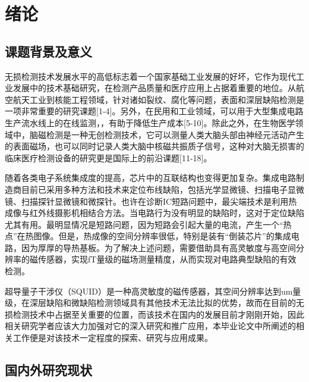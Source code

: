 \documentclass[a4paper,12pt，twoside]{ctexart}
\begin{document}
	
	

	\section{绪论}
	
	\subsection{课题背景及意义}
	无损检测技术发展水平的高低标志着一个国家基础工业发展的好坏，它作为现代工业发展中的技术基础研究，在检测产品质量和医疗应用上占据着重要的地位。从航空航天工业到核能工程领域，针对诸如裂纹、腐化等问题，表面和深层缺陷检测是一项非常重要的研究课题[1-4]。另外，在民用和工业领域，可以用于大型集成电路生产流水线上的在线监测，，有助于降低生产成本[5-10]。除此之外，在生物医学领域中，脑磁检测是一种无创检测技术，它可以测量人类大脑头部由神经元活动产生的表面磁场，也可以同时记录人类大脑中核磁共振质子信号，这种对大脑无损害的临床医疗检测设备的研究更是国际上的前沿课题[11-18]。\par
	随着各类电子系统集成度的提高，芯片中的互联结构也变得更加复杂。集成电路制造商目前已采用多种方法和技术来定位布线缺陷，包括光学显微镜、扫描电子显微镜、扫描探针显微镜和微探针。也许在诊断IC短路问题中，最尖端技术是利用热成像与红外线摄影机相结合方法。当电路行为没有明显的缺陷时，这对于定位缺陷尤其有用。最明显情况是短路问题，因为短路会引起大量的电流，产生一个“热点”在热图像。但是，热成像的空间分辨率很低，特别是装有“倒装芯片”的集成电路，因为厚厚的导热基板。为了解决上述问题，需要借助具有高灵敏度与高空间分辨率的磁传感器，实现fT量级的磁场测量精度，从而实现对电路典型缺陷的有效检测。\par
	超导量子干涉仪（SQUID）是一种高灵敏度的磁传感器，其空间分辨率达到um量级，在深层缺陷和微缺陷检测领域具有其他技术无法比拟的优势，故而在目前的无损检测技术中占据至关重要的位置，而该技术在国内的发展目前才刚刚开始，因此相关研究学者应该大力加强对它的深入研究和推广应用，本毕业论文中所阐述的相关工作便是对该技术一定程度的探索、研究与应用成果。\par
	\subsection{国内外研究现状}
	
\end{document}
